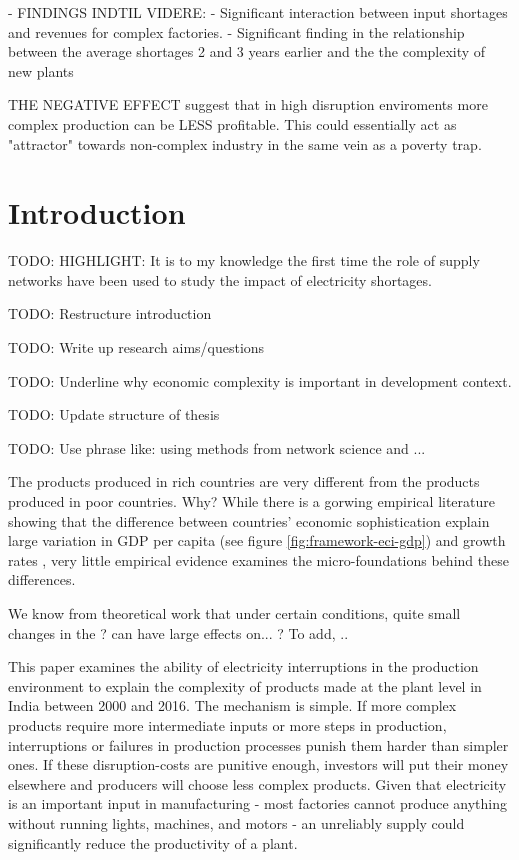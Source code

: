 \documentclass[11pt]{article}
\begin{document}
% 






 - FINDINGS INDTIL VIDERE:
 - Significant interaction between input shortages and revenues for complex factories. 
 - Significant finding in the relationship between the average shortages 2 and 3 years earlier and the the complexity of new plants 

 THE NEGATIVE EFFECT suggest that in high disruption enviroments more complex production can be LESS profitable. This could essentially act as "attractor" towards non-complex industry in the same vein as a poverty trap.


\section{Introduction}\label{sec:introduction}

TODO: HIGHLIGHT: It is to my knowledge the first time the role of supply networks have been used to study the impact of electricity shortages.

TODO: Restructure introduction

TODO: Write up research aims/questions

TODO: Underline why economic complexity is important in development context.

TODO: Update structure of thesis

TODO: Use phrase like: using methods from network science and ...

The products produced in rich countries are very different from the products produced in poor countries. Why? While there is a gorwing empirical literature showing that the difference between countries' economic sophistication explain large variation in GDP per capita (see figure \ref{fig:framework-eci-gdp}) and growth rates \citep{tacchella_dynamical_2018}, very little empirical evidence examines the micro-foundations behind these differences. 

We know from theoretical work that under certain conditions, quite small changes in the ? can have large effects on... ? To add, ..

This paper examines the ability of electricity interruptions in the production environment to explain the complexity of products made at the plant level in India between 2000 and 2016. The mechanism is simple. If more complex products require more intermediate inputs or more steps in production, interruptions or failures in production processes punish them harder than simpler ones. If these disruption-costs are punitive enough, investors will put their money elsewhere and producers will choose less complex products. Given that electricity is an important input in manufacturing -  most factories cannot produce anything without running lights, machines, and motors - an unreliably supply could significantly reduce the productivity of a plant.
\end{document}

